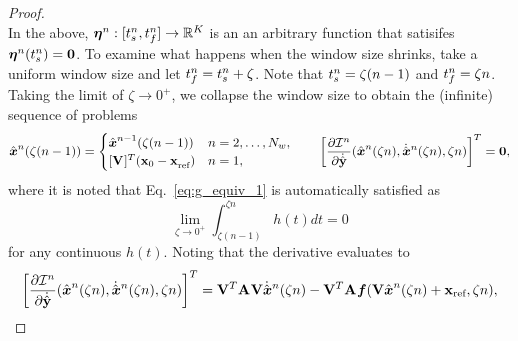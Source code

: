 \begin{proof}
\begin{equation*}
\end{equation*}
In the above, $\boldsymbol \eta^{n}: [t_s^{n},t_f^{n}] \rightarrow \mathbb{R}^{K}$ is an an arbitrary function that satisifes $\boldsymbol \eta^{n}(t_s^{n}) = \boldsymbol 0$. 
To examine what happens when the window size shrinks, take a uniform window size and let $t_f^{n} = t_s^{n} + \zeta$. Note that $t_s^{n} = \zeta (n-1)$ and $t_f^{n} = \zeta n$. %
Taking the limit of $\zeta \rightarrow 0^+$, we collapse the window size to obtain the (infinite) sequence of problems
\begin{equation*}
 \genstateArg{n}{\zeta(n-1)} = 
\begin{cases}
\genstate^{n-1}(\zeta(n-1)) & n=2,\ldots,\nslabs,\\
\genstateIC & n=1, \end{cases} \qquad
\bigg[ \frac{\partial \minintegrandArg{n}}{\partial \dot{\genstateyDiscrete}}(\genstateArg{n}{\zeta n},\genstateDotArg{n}{\zeta n},\zeta n) \bigg]^T= \boldsymbol 0,
\end{equation*}
where it is noted that Eq.~\eqref{eq:g_equiv_1} is automatically satisfied as
 \begin{equation*}
\lim_{\zeta \rightarrow 0^+}  \int_{\zeta (n-1)}^{\zeta n} h(t) dt = 0
\end{equation*}
for any continuous $h(t)$.
Noting that the derivative evaluates to
\begin{equation*}
\bigg[ \frac{\partial \minintegrandArg{n}}{\partial \dot{\genstateyDiscrete}}(\genstateArg{n}{\zeta n},\genstateDotArg{n}{\zeta n},\zeta n) \bigg]^T=
\basisspace^T \stweightingMatArgt{}{\zeta n} \basisspace \genstateDotArg{n}{\zeta n} -  \basisspace^T \stweightingMatArgt{}{\zeta n} \velocity(\basisspace \genstateArg{n}{\zeta n} + \stateIntercept ,\zeta n), 

\end{equation*}
\end{proof}
